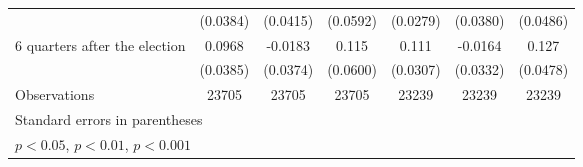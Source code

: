 \begin{table}[!ht]
\begin{tabular}{l*{6}{c}}
                    &    (0.0384)         &    (0.0415)         &    (0.0592)         &    (0.0279)         &    (0.0380)         &    (0.0486)         \\
[1em]
 6 quarters after the election&      0.0968\sym{*}  &     -0.0183         &       0.115         &       0.111\sym{***}&     -0.0164         &       0.127\sym{**} \\
                    &    (0.0385)         &    (0.0374)         &    (0.0600)         &    (0.0307)         &    (0.0332)         &    (0.0478)         \\
\hline
Observations        &       23705         &       23705         &       23705         &       23239         &       23239         &       23239         \\
\hline\hline
\multicolumn{7}{l}{\footnotesize Standard errors in parentheses}\\
\multicolumn{7}{l}{\footnotesize \sym{*} \(p<0.05\), \sym{**} \(p<0.01\), \sym{***} \(p<0.001\)}\\
\end{tabular}
\end{table}
